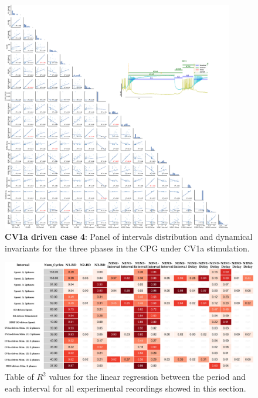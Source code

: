 %

\begin{figure}[htbp]
	\centering
	\includegraphics[width=0.9\textwidth]{./img/invariants/data/SUSSEX/CV1a_driven4/images/3phases/panel_with_pairplot.pdf}
	\caption{\textbf{CV1a driven case 4}: Panel of intervals distribution and dynamical invariants for the three phases in the CPG under CV1a stimulation.}
	\label{fig:cv1a 4 3phases pairplot}
\end{figure}



\begin{figure}
	\includegraphics[width=\textwidth]{./img/invariants/styled_table_invariants_prettyprint.pdf}
	\caption{Table of $R^2$ values for the linear regression between the period and each interval for all experimental recordings showed in this section.}
	\label{fig:R2 table}
\end{figure}
